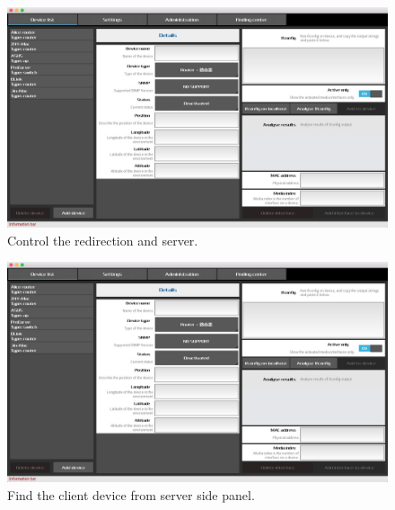 \begin{figure}[!ht]
	\includegraphics[width=\textwidth]{images/gui1}
	\caption{Control the redirection and server.}
\end{figure}

\begin{figure}[!ht]
	\includegraphics[width=\textwidth]{images/gui1}
	\caption{Find the client device from server side panel.}
\end{figure}
